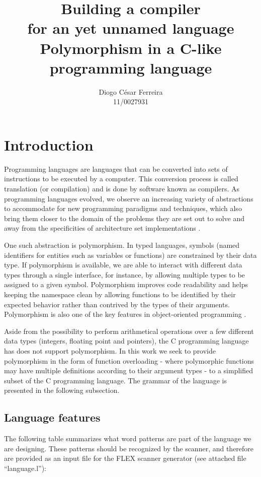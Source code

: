 \documentclass[12pt]{article}
\begin{document}
\title{Building a compiler\\\Large for an yet unnamed language\\\small Polymorphism in a C-like programming language}

\author{Diogo César Ferreira\\11/0027931}
\maketitle

\section{Introduction}
Programming languages are languages that can be converted into sets of instructions to be executed by a computer. This conversion process is called translation (or compilation) and is done by software known as compilers. As programming languages evolved, we observe an increasing variety of abstractions to accommodate for new programming paradigms and techniques, which also bring them closer to the domain of the problems they are set out to solve and away from the specificities of architecture set implementations \cite{Aho2007}.

One such abstraction is polymorphism. In typed languages, symbols (named identifiers for entities such as variables or functions) are constrained by their data type. If polymorphism is available, we are able to interact with different data types through a single interface, for instance, by allowing multiple types to be assigned  to a given symbol. Polymorphism improves code readability and helps keeping the namespace clean by allowing functions to be identified by their expected behavior rather than contrived by the types of their arguments. Polymorphism is also one of the key features in object-oriented programming \cite{Aho2007, Strachey2000}.

Aside from the possibility to perform arithmetical operations over a few different data types (integers, floating point and pointers), the C programming language has does not support polymorphism. In this work we seek to provide polymorphism in the form of function overloading - where polymorphic functions may have multiple definitions according to their argument types - to a simplified subset of the C programming language. The grammar of the language is presented in the following subsection.


\subsection{Language features}
The following table summarizes what word patterns are part of the language we are designing.
These patterns should be recognized by the scanner, and therefore are provided as an input file
for the FLEX \cite{FLEX} scanner generator (see attached file ``language.l''):
\end{document}
